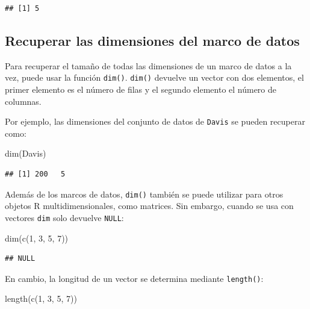 \documentclass[
]{book}
\newenvironment{Shaded}{\begin{snugshade}}{\end{snugshade}}
\newcommand{\DecValTok}[1]{\textcolor[rgb]{0.00,0.00,0.81}{#1}}
\newcommand{\FunctionTok}[1]{\textcolor[rgb]{0.00,0.00,0.00}{#1}}
\newcommand{\NormalTok}[1]{#1}
\begin{document}
\begin{verbatim}
## [1] 5
\end{verbatim}

\hypertarget{recuperar-las-dimensiones-del-marco-de-datos}{%
\subsection{Recuperar las dimensiones del marco de datos}\label{recuperar-las-dimensiones-del-marco-de-datos}}

Para recuperar el tamaño de todas las dimensiones de un marco de datos a la vez, puede usar la función \texttt{dim()}. \texttt{dim()} devuelve un vector con dos elementos, el primer elemento es el número de filas y el segundo elemento el número de columnas.

Por ejemplo, las dimensiones del conjunto de datos de \texttt{Davis} se pueden recuperar como:

\begin{Shaded}
\begin{Highlighting}[]
\FunctionTok{dim}\NormalTok{(Davis)}
\end{Highlighting}
\end{Shaded}

\begin{verbatim}
## [1] 200   5
\end{verbatim}

Además de los marcos de datos, \texttt{dim()} también se puede utilizar para otros objetos R multidimensionales, como matrices. Sin embargo, cuando se usa con vectores \texttt{dim} solo devuelve \texttt{NULL}:

\begin{Shaded}
\begin{Highlighting}[]
\FunctionTok{dim}\NormalTok{(}\FunctionTok{c}\NormalTok{(}\DecValTok{1}\NormalTok{, }\DecValTok{3}\NormalTok{, }\DecValTok{5}\NormalTok{, }\DecValTok{7}\NormalTok{))}
\end{Highlighting}
\end{Shaded}

\begin{verbatim}
## NULL
\end{verbatim}

En cambio, la longitud de un vector se determina mediante \texttt{length()}:

\begin{Shaded}
\begin{Highlighting}[]
\FunctionTok{length}\NormalTok{(}\FunctionTok{c}\NormalTok{(}\DecValTok{1}\NormalTok{, }\DecValTok{3}\NormalTok{, }\DecValTok{5}\NormalTok{, }\DecValTok{7}\NormalTok{))}
\end{Highlighting}
\end{Shaded}
\end{document}
